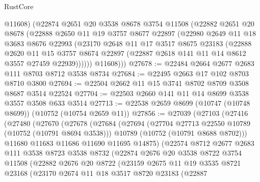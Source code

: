 \begin{lexlean}{RustCore}
\begin{coremodule}
          @11608)
        (@22874
          @2651
          @20
          @3538
          @8678
          @3754
          @11508
          (@22882
            @2651
            @20
            @8678
            (@22888
              @2650
              @11
              @19
              @3757
              @8677
              @22897
              (@22980
                @2649
                @11
                @18
                @3683
                @8676
                @22993
                (@23170
                  @2648
                  @11
                  @17
                  @3517
                  @8675
                  @23183
                  (@22888
                    @2620
                    @11
                    @15
                    @3757
                    @8674
                    @22897
                    (@22887 @2618 @141 @11 @14 @8612 @3557 @27459 @22939))))))
          @11608)))
@27678 := @22484 @2664 @2677 @2683 @111 @8703 @8712 @3538 @8734
@27684 := @22495 @2663 @17 @102 @8703 @8710 @3800
@27694 := @22504 @2662 @11 @15 @3741 @8702 @8709 @3508 @8687 @3514 @22524
@27704 := @22503 @2660 @141 @11 @14 @8699 @3538 @3557 @3508 @633 @3514
@27713 := @22538 @2659 @8699 (@10747 (@10748 @8699)) (@10752 (@10754 @2659 @11))
@27856 := @27039
    (@27103
      (@27416
        (@27480
          (@27670
            (@27678
              (@27684
                (@27694
                  (@27704 @27713 @22550 @10789 (@10752 (@10791 @8694 @3538)))
                  @10789
                  (@10752 (@10791 @8688 @8702)))
                @11680
                @11683
                @11686
                @11690
                @11695
                @14875)
              (@22574
                @8712
                @2677
                @2683
                @111
                @3538
                @8723
                @3538
                @8732
                (@22874
                  @2676
                  @20
                  @3538
                  @8722
                  @3754
                  @11508
                  (@22882
                    @2676
                    @20
                    @8722
                    (@23159
                      @2675
                      @11
                      @19
                      @3535
                      @8721
                      @23168
                      (@23170
                        @2674
                        @11
                        @18
                        @3517
                        @8720
                        @23183
                        (@22887

\end{coremodule}
\end{lexlean}
